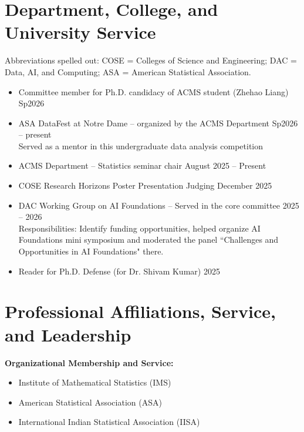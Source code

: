 \documentclass[letterpaper,oneside]{article}
\begin{document}
\section*{Department, College, and University Service}
\noindent Abbreviations spelled out: COSE = Colleges of Science and Engineering; DAC = Data, AI, and Computing; ASA = American Statistical Association.
\begin{itemize}[leftmargin=0pt, label={}]
	
	
  \item Committee member for Ph.D. candidacy of ACMS student (Zhehao Liang)
  \hfill  Sp2026
  \item ASA DataFest at Notre Dame -- organized by the ACMS Department
  \hfill Sp2026 -- present\\
  Served as a mentor in this undergraduate data analysis competition
  \item ACMS Department -- Statistics seminar chair \hfill August 2025 -- Present
  \item COSE Research Horizons Poster Presentation Judging \hfill December 2025
  \item DAC Working Group on AI Foundations --  Served in the core committee
  \hfill 2025 -- 2026\\
  Responsibilities: Identify funding opportunities, helped organize AI Foundations mini symposium and moderated the panel ``Challenges and Opportunities in AI Foundations" there.
  
  \item Reader for Ph.D. Defense (for Dr. Shivam Kumar)
  \hfill 2025
  
  
  
\end{itemize}

\section*{Professional Affiliations, Service, and Leadership}

\noindent\textbf{Organizational Membership and Service:}
\begin{itemize}[leftmargin=0pt, label={}]
  \item Institute of Mathematical Statistics (IMS)
  
  \item American Statistical Association (ASA)
  
  \item International Indian Statistical Association (IISA)

\end{itemize}
\end{document}
